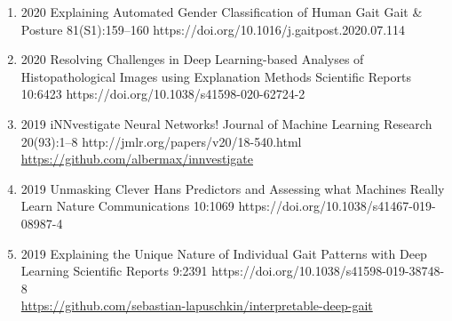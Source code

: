 {\begin{enumerate}
    \item {}
                        {2020}
                        {Explaining Automated Gender Classification of Human Gait}
                        {Gait \& Posture}
                        {81(S1):159--160}
                        {https://doi.org/10.1016/j.gaitpost.2020.07.114}

    \item {}
                        {2020}
                        {Resolving Challenges in Deep Learning-based Analyses of Histopathological Images using Explanation Methods}
                        {Scientific Reports}
                        {10:6423}
                        {https://doi.org/10.1038/s41598-020-62724-2}

    \item {}
                        {2019}
                        {iNNvestigate Neural Networks!}
                        {Journal of Machine Learning Research}
                        {20(93):1--8}
                        {http://jmlr.org/papers/v20/18-540.html}
                        {\\\href{https://github.com/albermax/innvestigate}{https://github.com/albermax/innvestigate}}

    \item {}
                        {2019}
                        {Unmasking Clever Hans Predictors and Assessing what Machines Really Learn}
                        {Nature Communications}
                        {10:1069}
                        {https://doi.org/10.1038/s41467-019-08987-4}

    \item {}
                        {2019}
                        {Explaining the Unique Nature of Individual Gait Patterns with Deep Learning}
                        {Scientific Reports}
                        {9:2391}
                        {https://doi.org/10.1038/s41598-019-38748-8}
                        {\\\href{https://github.com/sebastian-lapuschkin/interpretable-deep-gait}{https://github.com/sebastian-lapuschkin/interpretable-deep-gait}}


\end{enumerate}}
